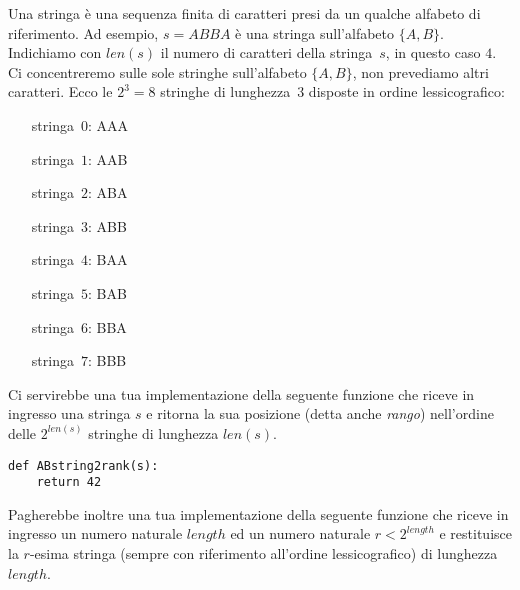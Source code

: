 \renewcommand{\nomebreve}{rank\_unrank\_ABstrings}
\renewcommand{\titolo}{Rank ed unrank di stringhe su alfabeto binario}

\introduzione{}

Una stringa è una sequenza finita di caratteri presi da un qualche alfabeto di riferimento. Ad esempio, $s=ABBA$ è una stringa sull'alfabeto $\{A,B\}$.
Indichiamo con $len(s)$ il numero di caratteri della stringa~$s$, in questo caso $4$. Ci concentreremo sulle sole stringhe sull'alfabeto $\{A,B\}$, non prevediamo altri caratteri.
Ecco le $2^3=8$ stringhe di lunghezza~$3$ disposte in ordine lessicografico:\\

\noindent
\hspace{2cm}
\begin{minipage}[c]{.30\textwidth}
\begin{itemize}
\item[stringa~$0$:] AAA
\item[stringa~$1$:] AAB
\item[stringa~$2$:] ABA
\item[stringa~$3$:] ABB
\end{itemize}
\end{minipage}
\hspace{10.0mm}
\begin{minipage}[c]{.30\textwidth}
\begin{itemize}  
\item[stringa~$4$:] BAA
\item[stringa~$5$:] BAB
\item[stringa~$6$:] BBA
\item[stringa~$7$:] BBB
\end{itemize}
\end{minipage}

\bigskip
\noindent
Ci servirebbe una tua implementazione della seguente funzione che riceve in ingresso una stringa $s$ e ritorna la sua posizione (detta anche \emph{rango}) nell'ordine delle $2^{len(s)}$ stringhe di lunghezza $len(s)$.

\begin{verbatim}
def ABstring2rank(s):
    return 42
\end{verbatim}

Pagherebbe inoltre una tua implementazione della seguente funzione che riceve in ingresso un numero naturale $length$ ed un numero naturale $r < 2^{length}$ e
restituisce la $r$-esima stringa (sempre con riferimento all'ordine lessicografico) di lunghezza $length$.

